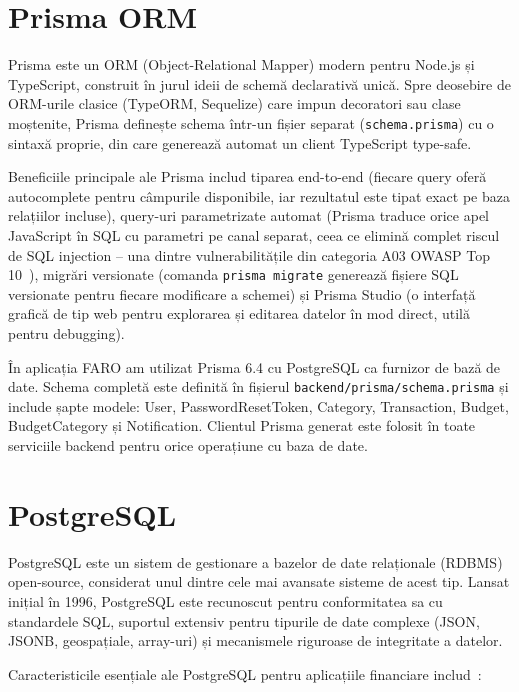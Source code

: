 \documentclass[12pt,a4paper,oneside]{report}
\begin{document}
\section{Prisma ORM}

Prisma este un ORM (Object-Relational Mapper) modern pentru Node.js și TypeScript, construit în jurul ideii de schemă declarativă unică. Spre deosebire de ORM-urile clasice (TypeORM, Sequelize) care impun decoratori sau clase moștenite, Prisma definește schema într-un fișier separat (\texttt{schema.prisma}) cu o sintaxă proprie, din care generează automat un client TypeScript type-safe. \cite{ref:prisma}

Beneficiile principale ale Prisma includ tiparea end-to-end (fiecare query oferă autocomplete pentru câmpurile disponibile, iar rezultatul este tipat exact pe baza relațiilor incluse), query-uri parametrizate automat (Prisma traduce orice apel JavaScript în SQL cu parametri pe canal separat, ceea ce elimină complet riscul de SQL injection -- una dintre vulnerabilitățile din categoria A03 OWASP Top 10~\cite{ref:owasp}), migrări versionate (comanda \texttt{prisma migrate} generează fișiere SQL versionate pentru fiecare modificare a schemei) și Prisma Studio (o interfață grafică de tip web pentru explorarea și editarea datelor în mod direct, utilă pentru debugging).

În aplicația FARO am utilizat Prisma 6.4 cu PostgreSQL ca furnizor de bază de date. Schema completă este definită în fișierul \texttt{backend/prisma/schema.prisma} și include șapte modele: User, PasswordResetToken, Category, Transaction, Budget, BudgetCategory și Notification. Clientul Prisma generat este folosit în toate serviciile backend pentru orice operațiune cu baza de date.

\section{PostgreSQL}

PostgreSQL este un sistem de gestionare a bazelor de date relaționale (RDBMS) open-source, considerat unul dintre cele mai avansate sisteme de acest tip. Lansat inițial în 1996, PostgreSQL este recunoscut pentru conformitatea sa cu standardele SQL, suportul extensiv pentru tipurile de date complexe (JSON, JSONB, geospațiale, array-uri) și mecanismele riguroase de integritate a datelor. \cite{ref:postgres}

Caracteristicile esențiale ale PostgreSQL pentru aplicațiile financiare includ~\cite{ref:dbconcepts}:
\end{document}
